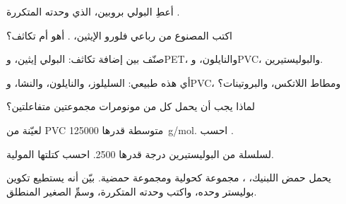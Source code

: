 \begin{exercise}[$\star$]\label{exo:g12:polymers:1}
أعطِ  البولي بروبين، الذي وحدته المتكررة
.
\end{exercise}

\begin{exercise}[$\star$]\label{exo:g12:polymers:2}
اكتب   المصنوع من رباعي فلورو الإيثين،
. أهو  أم تكاثف؟
\end{exercise}

\begin{exercise}[$\star$]\label{exo:g12:polymers:3}
صنّف بين  إضافة  تكاثف: البولي إيثين، وPET، والنايلون،
وPVC، والبوليستيرين.
\end{exercise}

\begin{exercise}[$\star$]\label{exo:g12:polymers:4}
أي هذه  طبيعي: السليلوز، والنايلون، والنشا، وPVC،
ومطاط اللاتكس، والبروتينات؟
\end{exercise}

\begin{exercise}[$\star$]\label{exo:g12:polymers:5}
لماذا يجب أن يحمل كل  من مونومرات  مجموعتين
متفاعلتين؟
\end{exercise}

\begin{exercise}[$\star\star$]\label{exo:g12:polymers:6}
لعيّنة من PVC  متوسطة قدرها \qty{125000}{g/mol}.
احسب .
\end{exercise}

\begin{exercise}[$\star\star$]\label{exo:g12:polymers:7}
لسلسلة من البوليستيرين درجة  قدرها 2500. احسب
كتلتها المولية.
\end{exercise}

\begin{exercise}[$\star\star$]\label{exo:g12:polymers:8}
يحمل حمض اللبنيك، ، مجموعة كحولية ومجموعة
حمضية. بيّن أنه يستطيع تكوين بوليستر وحده، واكتب وحدته
المتكررة، وسمِّ  الصغير المنطلق.
\end{exercise}

